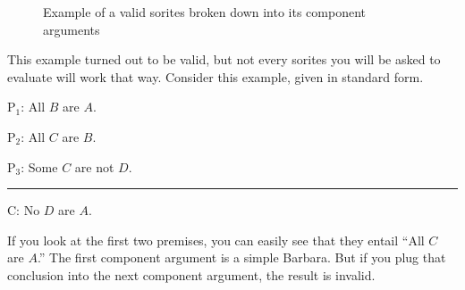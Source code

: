 {\begin{figure}
\begin{mdframed}[style=mytableclearbox]
\end{mdframed}
\caption{Example of a valid sorites broken down into its component arguments}
\label{fig:sorites_example_1}
\end{figure}

This example turned out to be valid, but not every sorites you will be asked to evaluate will work that way. Consider this example, given in standard form. 


\begin{earg} 
\item[P$_1$:] All $B$ are $A$.
\item[P$_2$:] All $C$ are $B$.  %
\item[P$_3$:] Some $C$ are not $D$.
\vspace{-.5em} 
 \item [] \rule{0.2\linewidth}{.5pt} 
\item[C:] No $D$ are $A$.
 \end{earg} 

If you look at the first two premises, you can easily see that they entail ``All $C$ are $A$.'' The first component argument is a simple Barbara. But if you plug that conclusion into the next component argument, the result is invalid. 

}
